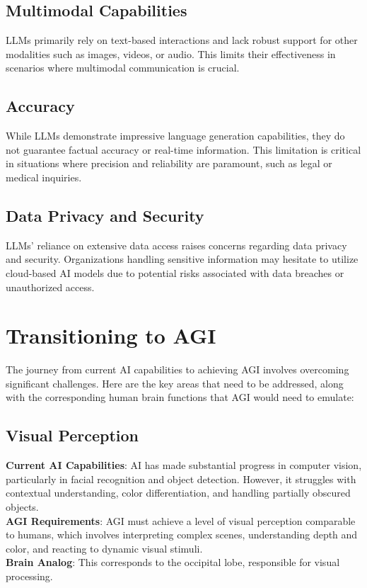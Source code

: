 \documentclass[a4paper,10.5pt]{article}
\begin{document}
\subsection{Multimodal Capabilities}
LLMs primarily rely on text-based interactions and lack robust support for other modalities such as images, videos, or audio. This limits their effectiveness in scenarios where multimodal communication is crucial.

\subsection{Accuracy}
While LLMs demonstrate impressive language generation capabilities, they do not guarantee factual accuracy or real-time information. This limitation is critical in situations where precision and reliability are paramount, such as legal or medical inquiries.

\subsection{Data Privacy and Security}
LLMs' reliance on extensive data access raises concerns regarding data privacy and security. Organizations handling sensitive information may hesitate to utilize cloud-based AI models due to potential risks associated with data breaches or unauthorized access.

\section{Transitioning to AGI}

The journey from current AI capabilities to achieving AGI involves overcoming significant challenges. Here are the key areas that need to be addressed, along with the corresponding human brain functions that AGI would need to emulate:

\subsection{Visual Perception}
\textbf{Current AI Capabilities}: AI has made substantial progress in computer vision, particularly in facial recognition and object detection. However, it struggles with contextual understanding, color differentiation, and handling partially obscured objects. \\
\textbf{AGI Requirements}: AGI must achieve a level of visual perception comparable to humans, which involves interpreting complex scenes, understanding depth and color, and reacting to dynamic visual stimuli. \\
\textbf{Brain Analog}: This corresponds to the occipital lobe, responsible for visual processing.
\end{document}

